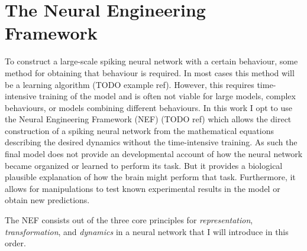 \chapter{The Neural Engineering Framework}

To construct a large-scale spiking neural network with a certain behaviour, some method for obtaining that behaviour is required.
In most cases this method will be a learning algorithm (TODO example ref).
However, this requires time-intensive training of the model and is often not viable for large models, complex behaviours, or models combining different behaviours.
In this work I opt to use the Neural Engineering Framework (NEF) (TODO ref) which allows the direct construction of a spiking neural network from the mathematical equations describing the desired dynamics without the time-intensive training.
As such the final model does not provide an developmental account of how the neural network became organized or learned to perform its task.
But it provides a biological plausible explanation of how the brain might perform that task.
Furthermore, it allows for manipulations to test known experimental results in the model or obtain new predictions.

The NEF consists out of the three core principles for \emph{representation}, \emph{transformation}, and \emph{dynamics} in a neural network that I will introduce in this order.

